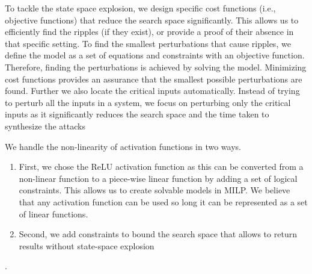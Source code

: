To tackle the state space explosion, we design \attack specific cost functions (i.e., objective functions) that reduce the search space significantly. This allows us to efficiently find the ripples (if they exist), or provide a proof of their absence in that specific setting. To find the smallest perturbations that cause  ripples, we define the model as a set of equations and constraints with an objective function. Therefore, finding the perturbations is achieved by solving the model. Minimizing cost functions provides an assurance that the smallest possible perturbations are found. %
Further we also locate the critical inputs automatically. Instead of trying to perturb all the inputs in a system, we focus on perturbing only the critical %
inputs as it significantly reduces the search space and the time taken to synthesize the attacks %

We handle the non-linearity of activation functions in two ways. 
\begin{enumerate}
	\item First, we chose the ReLU activation function as this can be converted from a non-linear function to a piece-wise linear function by adding a set of logical constraints. This allows us to create solvable models in MILP. We believe that any activation function can be used so long it can be represented as a set of linear functions. 
	\item Second, we add constraints to bound the search space that allows \tool to return results without state-space explosion
\end{enumerate}
 . %




